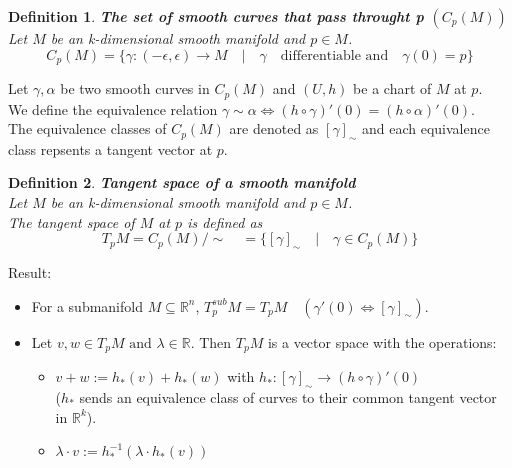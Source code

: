 \documentclass[11pt]{book} %
\newtheorem{definition}{Definition}[section]
\begin{document}
\begin{definition}{\textbf{The set of smooth curves that pass throught p  $(C_p(M))$}} \\
    Let \( M \) be an k-dimensional smooth manifold and \( p \in M \). \\
    \begin{equation*}
        C_p(M) = \{ \gamma : (-\epsilon, \epsilon) \to M \quad | \quad \gamma \quad \text{differentiable and} \quad \gamma(0) = p \} 
    \end{equation*}
\end{definition}

Let \( \gamma , \alpha \) be two smooth curves in \( C_p(M) \) and \( (U, h) \) be a chart of \( M \) at \( p \). \\
We define the equivalence relation $ \gamma \sim \alpha \iff  (h \circ \gamma )'(0) = (h \circ \alpha)'(0) $. \\ 
The equivalence classes of \( C_p(M) \) are denoted as \( [ \gamma ]_\sim \) and each equivalence class repsents a tangent vector at \( p \). \\

\begin{definition}{\textbf{Tangent space of a smooth manifold}} \\
    Let \( M \) be an k-dimensional smooth manifold and \( p \in M \). \\
    The tangent space of \( M \) at \( p \) is defined as 
    \begin{equation*}
        T_pM = C_p(M)/\sim \quad = \{ [ \gamma ]_\sim \quad | \quad \gamma \in C_p(M) \}
    \end{equation*}
\end{definition}

Result: 
\begin{itemize}
    \item For a submanifold \( M \subseteq \mathbb{R}^n \), \( T_p^{sub}M = T_pM \quad (\gamma'(0) \iff [\gamma]_\sim) \).
    \item Let \( v, w \in T_pM \text{ and } \lambda \in \mathbb{R} \). Then \(T_pM\) is a vector space with the operations: 
        \begin{itemize}
            \item \( v + w := h_*(v) + h_*(w) \) with \( h_* : [ \gamma ]_\sim \to (h \circ \gamma )'(0) \) \\
            ($h_*$ sends an equivalence class of curves to their common tangent vector in \( \mathbb{R}^k \)).
            \item \( \lambda \cdot v := h_*^{-1} (\lambda \cdot h_*(v)) \)
        \end{itemize}
\end{itemize}
\end{document}
